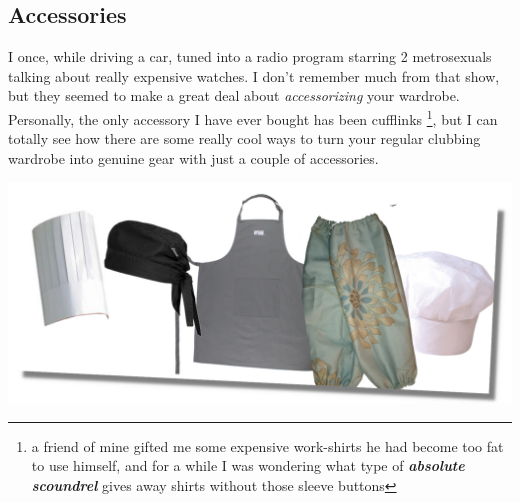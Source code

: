 \vspace{10pt}

\newpage
\subsection*{Accessories}
I once, while driving a car, tuned into a radio program starring 2 metrosexuals talking about really expensive watches. I don't remember much from that show, but they seemed to make a great deal about \textit{accessorizing} your wardrobe. Personally, the only accessory I have ever  bought has been cufflinks \footnote{a friend of mine gifted me some expensive work-shirts he had become too fat to use himself, and for a while I was wondering what type of \textbf{\textit{absolute scoundrel}} gives away shirts without those sleeve buttons}, but I can totally see how there are some really cool ways to turn your regular clubbing wardrobe into genuine \sovs gear with just a couple of accessories.

\begin{center}
\includegraphics[scale=0.3]{03-Outro/accessories-final}
\end{center}
